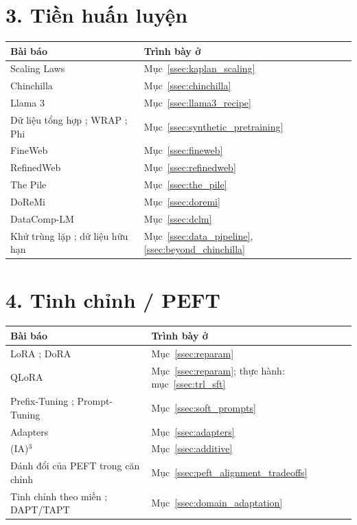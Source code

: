 \section*{3. Tiền huấn luyện}
\begin{longtable}{@{}p{7.2cm}p{7.6cm}@{}}
\toprule
\textbf{Bài báo} & \textbf{Trình bày ở} \\
\midrule
\endhead
Scaling Laws \cite{kaplan2020scaling} & Mục~\ref{ssec:kaplan_scaling} \\
Chinchilla \cite{hoffmann2022chinchilla} & Mục~\ref{ssec:chinchilla} \\
Llama 3 \cite{grattafiori2024llama3} & Mục~\ref{ssec:llama3_recipe} \\
Dữ liệu tổng hợp \cite{kang2025synthetic}; WRAP \cite{maini2024wrap}; Phi \cite{gunasekar2023textbooks} & Mục~\ref{ssec:synthetic_pretraining} \\
FineWeb \cite{penedo2024fineweb} & Mục~\ref{ssec:fineweb} \\
RefinedWeb \cite{penedo2023refinedweb} & Mục~\ref{ssec:refinedweb} \\
The Pile \cite{gao2020pile} & Mục~\ref{ssec:the_pile} \\
DoReMi \cite{xie2023doremi} & Mục~\ref{ssec:doremi} \\
DataComp-LM \cite{li2024dclm} & Mục~\ref{ssec:dclm} \\
Khử trùng lặp \cite{lee2022dedup}; dữ liệu hữu hạn \cite{muennighoff2023scaling} & Mục~\ref{ssec:data_pipeline}, \ref{ssec:beyond_chinchilla} \\
\bottomrule
\end{longtable}

\section*{4. Tinh chỉnh / PEFT}
\begin{longtable}{@{}p{7.2cm}p{7.6cm}@{}}
\toprule
\textbf{Bài báo} & \textbf{Trình bày ở} \\
\midrule
\endhead
LoRA \cite{hu2021lora}; DoRA \cite{liu2024dora} & Mục~\ref{ssec:reparam} \\
QLoRA \cite{dettmers2023qlora} & Mục~\ref{ssec:reparam}; thực hành: mục~\ref{ssec:trl_sft} \\
Prefix-Tuning \cite{li2021prefix}; Prompt-Tuning \cite{lester2021power} & Mục~\ref{ssec:soft_prompts} \\
Adapters \cite{houlsby2019parameter} & Mục~\ref{ssec:adapters} \\
(IA)$^3$ \cite{liu2022ia3} & Mục~\ref{ssec:additive} \\
Đánh đổi của PEFT trong căn chỉnh \cite{thakkar2024deepdive} & Mục~\ref{ssec:peft_alignment_tradeoffs} \\
Tinh chỉnh theo miền \cite{moslem2023adaptivemt}; DAPT/TAPT \cite{gururangan2020dontstop} & Mục~\ref{ssec:domain_adaptation} \\
\bottomrule
\end{longtable}

